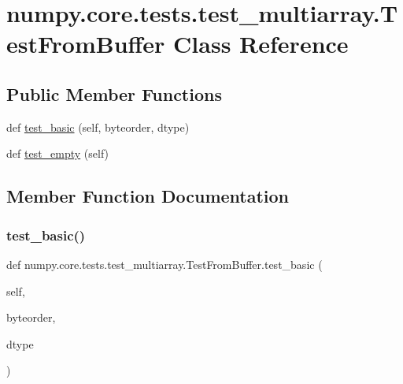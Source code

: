\hypertarget{classnumpy_1_1core_1_1tests_1_1test__multiarray_1_1TestFromBuffer}{}\section{numpy.\+core.\+tests.\+test\+\_\+multiarray.\+Test\+From\+Buffer Class Reference}
\label{classnumpy_1_1core_1_1tests_1_1test__multiarray_1_1TestFromBuffer}
\subsection*{Public Member Functions}
\begin{DoxyCompactItemize}
\item 
def \hyperlink{classnumpy_1_1core_1_1tests_1_1test__multiarray_1_1TestFromBuffer_af7c417a9f40b750fde838b065d4dd816}{test\+\_\+basic} (self, byteorder, dtype)
\item 
def \hyperlink{classnumpy_1_1core_1_1tests_1_1test__multiarray_1_1TestFromBuffer_af2e353af13b4262d0f228e8c3cdff774}{test\+\_\+empty} (self)
\end{DoxyCompactItemize}


\subsection{Member Function Documentation}
\mbox{\label{classnumpy_1_1core_1_1tests_1_1test__multiarray_1_1TestFromBuffer_af7c417a9f40b750fde838b065d4dd816}} 
\subsubsection{\texorpdfstring{test\+\_\+basic()}{test\_basic()}}
{\footnotesize\ttfamily def numpy.\+core.\+tests.\+test\+\_\+multiarray.\+Test\+From\+Buffer.\+test\+\_\+basic (\begin{DoxyParamCaption}\item[{}]{self,  }\item[{}]{byteorder,  }\item[{}]{dtype }\end{DoxyParamCaption})}

